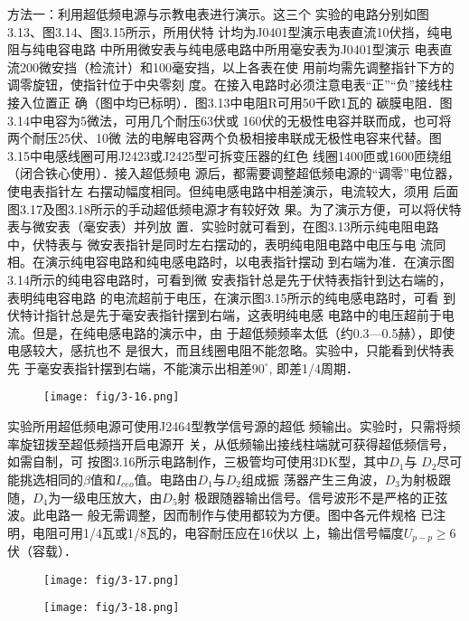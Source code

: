 方法一：利用超低频电源与示教电表进行演示。这三个
实验的电路分别如图3.13、图3.14、图3.15所示，所用伏特
计均为J0401型演示电表直流10伏挡，纯电阻与纯电容电路
中所用微安表与纯电感电路中所用毫安表为J0401型演示
电表直流200微安挡（检流计）和100毫安挡，以上各表在使
用前均需先调整指针下方的调零旋钮，使指针位于中央零刻
度。在接入电路时必须注意电表“正”“负”接线柱接入位置正
确（图中均已标明）．图3.13中电阻R可用50千欧1瓦的
碳膜电阻．图3.14中电容为5微法，可用几个耐压63伏或
160伏的无极性电容并联而成，也可将两个耐压25伏、10微
法的电解电容两个负极相接串联成无极性电容来代替。图
3.15中电感线圈可用J2423或J2425型可拆变压器的红色
线圈1400匝或1600匝绕组（闭合铁心使用）．接入超低频电
源后，都需要调整超低频电源的“调零”电位器，使电表指针左
右摆动幅度相同。但纯电感电路中相差演示，电流较大，须用
后面图3.17及图3.18所示的手动超低频电源才有较好效
果。为了演示方便，可以将伏特表与微安表（毫安表）并列放
置．实验时就可看到，在图3.13所示纯电阻电路中，伏特表与
微安表指针是同时左右摆动的，表明纯电阻电路中电压与电
流同相。在演示纯电容电路和纯电感电路时，以电表指针摆动
到右端为准．在演示图3.14所示的纯电容电路时，可看到微
安表指针总是先于伏特表指针到达右端的，表明纯电容电路
的电流超前于电压，在演示图3.15所示的纯电感电路时，可看
到伏特计指针总是先于毫安表指针摆到右端，这表明纯电感
电路中的电压超前于电流。但是，在纯电感电路的演示中，由
于超低频频率太低（约0.3—0.5赫），即使电感较大，感抗也不
是很大，而且线圈电阻不能忽略。实验中，只能看到伏特表先
于毫安表指针摆到右端，不能演示出相差$90^{\circ}$, 即差1/4周期．

\begin{figure}[htp]
    \centering
\texttt{[image: fig/3-16.png]}
    \caption{}
\end{figure}

实验所用超低频电源可使用J2464型教学信号源的超低
频输出。实验时，只需将频率旋钮拨至超低频挡开启电源开
关，从低频输出接线柱端就可获得超低频信号，如需自制，可
按图3.16所示电路制作，三极管均可使用3DK型，其中$D_1$与
$D_2$尽可能挑选相同的$\beta$值和$I_{ceo}$值。电路由$D_1$与$D_2$组成振
荡器产生三角波，$D_3$为射极跟随，$D_4$为一级电压放大，由$D_5$射
极跟随器输出信号。信号波形不是严格的正弦波。此电路一
般无需调整，因而制作与使用都较为方便。图中各元件规格
已注明，电阻可用1/4瓦或1/8瓦的，电容耐压应在16伏以
上，输出信号幅度$U_{p-p}\ge 6$伏（容载）．

\begin{figure}[htp]
    \centering
\texttt{[image: fig/3-17.png]}
    \caption{}
\end{figure}

\begin{figure}[htp]
    \centering
\texttt{[image: fig/3-18.png]}
    \caption{}
\end{figure}

